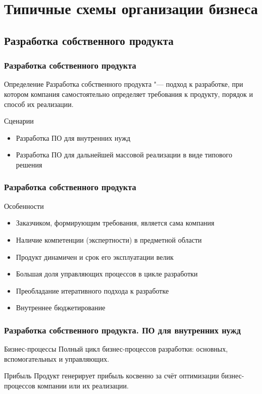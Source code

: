 \documentclass{../industrial-development}
\begin{document}
\section{Типичные схемы организации бизнеса}

\subsection{Разработка собственного продукта}


\begin{frame} \frametitle{Разработка собственного продукта}
	\begin{block}{Определение}
		\alert{Разработка собственного продукта} "--- подход к разработке, при котором компания самостоятельно определяет требования к продукту, порядок и способ их реализации.
	\end{block}
	\begin{block}{Сценарии}
		\begin{itemize}
			\item Разработка ПО для внутренних нужд
			\item Разработка ПО для дальнейшей массовой реализации в виде типового решения
		\end{itemize}
	\end{block}
\end{frame}
\lecturenotes


\begin{frame} \frametitle{Разработка собственного продукта}
	\begin{block}{Особенности}
		\begin{itemize}
			\item Заказчиком, формирующим требования, является сама компания
			\item Наличие компетенции (экспертности) в предметной области
			\item Продукт динамичен и срок его эксплуатации велик
			\item Большая доля управляющих процессов в цикле разработки
			\item Преобладание итеративного подхода к разработке
			\item Внутреннее бюджетирование
		\end{itemize}
	\end{block}
\end{frame}
\lecturenotes


\begin{frame} \frametitle{Разработка собственного продукта. ПО для внутренних нужд}
	\begin{block}{Бизнес-процессы}
		Полный цикл бизнес-процессов разработки: основных, вспомогательных и управляющих.
	\end{block}
	\begin{block}{Прибыль}
		Продукт генерирует прибыль косвенно за счёт оптимизации бизнес-процессов компании или их реализации.
	\end{block}
\end{frame}
\lecturenotes
\end{document}
